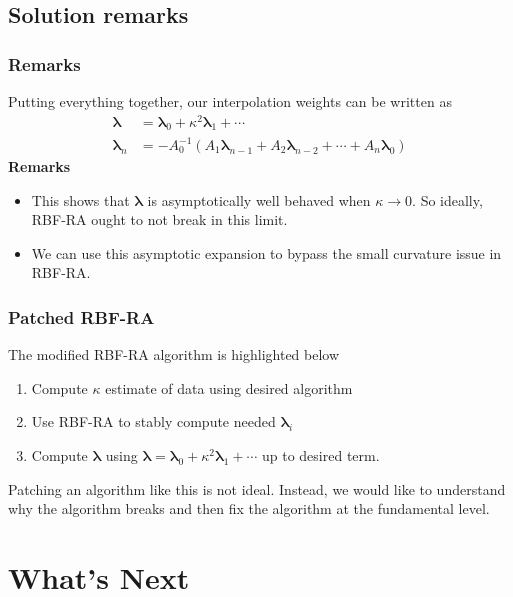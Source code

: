 \documentclass{cubeamer}
\begin{document}
\subsection{Solution remarks}

\begin{frame}
	\frametitle{Remarks}
	Putting everything together, our interpolation weights can be written as
	\begin{align*}
		\pmb{\lambda} &= \pmb{\lambda}_0 + \kappa^2 \pmb{\lambda}_1 + \cdots \\
		\pmb{\lambda}_n &= -A_0^{-1} (A_1\pmb{\lambda}_{n - 1} + A_2 \pmb{\lambda}_{n - 2} + \cdots + A_n \pmb{\lambda}_0)
	\end{align*}
	\pause \textbf{Remarks} \pause
	\begin{itemize}
		\item<3-> This shows that $ \pmb{\lambda} $ is asymptotically well behaved when $ \kappa \to 0 $. So ideally, RBF-RA ought to not break in this limit.
		\item<4-> We can use this asymptotic expansion to bypass the small curvature issue in RBF-RA.
	\end{itemize}
\end{frame}

\begin{frame}
	\frametitle{Patched RBF-RA}
	The modified RBF-RA algorithm is highlighted below
	\begin{enumerate}[label = (\alph*)]
		\item Compute $ \kappa $ estimate of data using desired algorithm
		\item Use RBF-RA to stably compute needed $ \pmb{\lambda}_i $
		\item Compute $ \pmb{\lambda} $ using $ \pmb{\lambda} = \pmb{\lambda}_0 + \kappa^2 \pmb{\lambda}_1 + \cdots $ up to desired term.
	\end{enumerate}
	\pause
	Patching an algorithm like this is not ideal. Instead, we would like to understand why the algorithm breaks and then fix the algorithm at the fundamental level.
\end{frame}


\section{What's Next}
\end{document}
